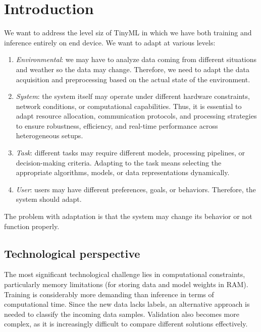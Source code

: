 \section{Introduction}

We want to address the level siz of TinyML in which we have both training and inference entirely on end device. 
We want to adapt at various levels: 
\begin{enumerate}
    \item \textit{Environmental}: we may have to analyze data coming from different situations and weather so the data may change. 
        Therefore, we need to adapt the data acquisition and preprocessing based on the actual state of the environment. 
    \item \textit{System}: the system itself may operate under different hardware constraints, network conditions, or computational capabilities. 
        Thus, it is essential to adapt resource allocation, communication protocols, and processing strategies to ensure robustness, efficiency, and real-time performance across heterogeneous setups.  
    \item \textit{Task}: different tasks may require different models, processing pipelines, or decision-making criteria.
        Adapting to the task means selecting the appropriate algorithms, models, or data representations dynamically.  
    \item \textit{User}: users may have different preferences, goals, or behaviors. 
        Therefore, the system should adapt. 
\end{enumerate}
\noindent The problem with adaptation is that the system may change its behavior or not function properly.

\subsection{Technological perspective}
The most significant technological challenge lies in computational constraints, particularly memory limitations (for storing data and model weights in RAM).
Training is considerably more demanding than inference in terms of computational time.
Since the new data lacks labels, an alternative approach is needed to classify the incoming data samples.
Validation also becomes more complex, as it is increasingly difficult to compare different solutions effectively.